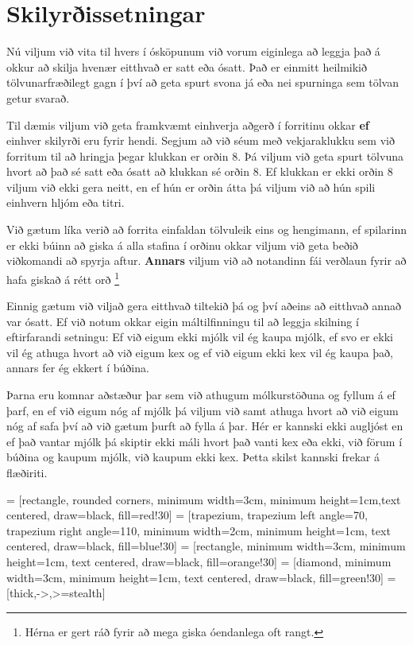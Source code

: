 \section{Skilyrðissetningar}
Nú viljum við vita til hvers í ósköpunum við vorum eiginlega að leggja það á okkur að skilja hvenær eitthvað er satt eða ósatt.
Það er einmitt heilmikið tölvunarfræðilegt gagn í því að geta spurt svona já eða nei spurninga sem tölvan getur svarað.

Til dæmis viljum við geta framkvæmt einhverja aðgerð í forritinu okkar \textbf{ef} einhver skilyrði eru fyrir hendi.
Segjum að við séum með vekjaraklukku sem við forritum til að hringja þegar klukkan er orðin 8.
Þá viljum við geta spurt tölvuna hvort að það sé satt eða ósatt að klukkan sé orðin 8.
Ef klukkan er ekki orðin 8 viljum við ekki gera neitt, en ef hún er orðin átta þá viljum við að hún spili einhvern hljóm eða titri.

Við gætum líka verið að forrita einfaldan tölvuleik eins og hengimann, ef spilarinn er ekki búinn að giska á alla stafina í orðinu okkar viljum við geta beðið viðkomandi að spyrja aftur.
\textbf{Annars} viljum við að notandinn fái verðlaun fyrir að hafa giskað á rétt orð \footnote{Hérna er gert ráð fyrir að mega giska óendanlega oft rangt.}

Einnig gætum við viljað gera eitthvað tiltekið þá og því aðeins að eitthvað annað var ósatt.
Ef við notum okkar eigin máltilfinningu til að leggja skilning í eftirfarandi setningu: Ef við eigum ekki mjólk vil ég kaupa mjólk, ef svo er ekki vil ég athuga hvort að við eigum kex og ef við eigum ekki kex vil ég kaupa það, annars fer ég ekkert í búðina.

Þarna eru komnar aðstæður þar sem við athugum mólkurstöðuna og fyllum á ef þarf, en ef við eigum nóg af mjólk þá viljum við samt athuga hvort að við eigum nóg af safa því að við gætum þurft að fylla á þar.
Hér er kannski ekki augljóst en ef það vantar mjólk þá skiptir ekki máli hvort það vanti kex eða ekki, við förum í búðina og kaupum mjólk, við kaupum ekki kex.
Þetta skilst kannski frekar á flæðiriti.


 = [rectangle, rounded corners, minimum width=3cm, minimum height=1cm,text centered, draw=black, fill=red!30]
 = [trapezium, trapezium left angle=70, trapezium right angle=110, minimum width=2cm, minimum height=1cm, text centered, draw=black, fill=blue!30]
 = [rectangle, minimum width=3cm, minimum height=1cm, text centered, draw=black, fill=orange!30]
 = [diamond, minimum width=3cm, minimum height=1cm, text centered, draw=black, fill=green!30]
 = [thick,->,>=stealth]


